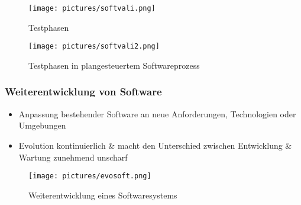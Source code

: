 \documentclass[12pt,a4paper,oneside]{article}
\begin{document}
\begin{figure}[H]
\begin{minipage}[t]{0.5\textwidth}
\centering
\texttt{[image: pictures/softvali.png]}
\caption{Testphasen}
\end{minipage}
\hfill
\begin{minipage}[t]{0.5\textwidth}
\centering
\texttt{[image: pictures/softvali2.png]}
\caption{Testphasen in plangesteuertem Softwareprozess}
\end{minipage}
\end{figure}

\newpage

\subsubsection{Weiterentwicklung von Software}
\begin{itemize}
\item Anpassung bestehender Software an neue Anforderungen, Technologien oder Umgebungen
\item Evolution kontinuierlich \& macht den Unterschied zwischen Entwicklung \& Wartung zunehmend unscharf
\end{itemize}

\begin{figure}[H]
\centering
\texttt{[image: pictures/evosoft.png]}
\caption{Weiterentwicklung eines Softwaresystems}
\end{figure}
\end{document}
